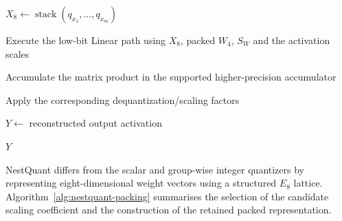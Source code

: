\begin{algorithm}[htbp]
\caption{Dynamic W4A8 runtime execution for one Linear layer}
\label{alg:w4a8-runtime}




$X_{8} \leftarrow
\operatorname{stack}(q_{x_1},\ldots,q_{x_m})$\;

Execute the low-bit Linear path using
$X_{8}$, packed $W_{4}$, $S_W$ and the activation scales\;

Accumulate the matrix product in the supported higher-precision
accumulator\;

Apply the corresponding dequantization/scaling factors\;

$Y \leftarrow$ reconstructed output activation\;

\Return $Y$\;

\end{algorithm}

NestQuant differs from the scalar and group-wise integer quantizers by
representing eight-dimensional weight vectors using a structured
\(E_8\) lattice. Algorithm~\ref{alg:nestquant-packing} summarises the
selection of the candidate scaling coefficient and the construction of
the retained packed representation.

